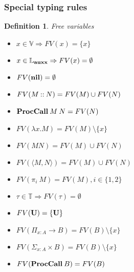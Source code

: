 \documentclass[a4paper]{article}
\newtheorem{defin}{Definition}
\begin{document}
\begin{prooftree}
\end{prooftree}

\begin{prooftree}
\end{prooftree}

\begin{prooftree}
\end{prooftree}

\subsubsection{Special typing rules}

\begin{prooftree}
\end{prooftree}

\begin{defin} Free variables

  \begin{itemize}
    \item $x \in \mathbb{V} \Rightarrow FV(x) = \{ x \}$
    \item $x \in \mathbb{L}_{\bf auxx} \Rightarrow FV(x) = \emptyset$
    \item $FV(\bf nil) = \emptyset$
    \item $FV(M {\: \bf :: \:} N) = FV(M) \cup FV(N)$
    \item ${\bf ProcCall \:} M \: N = FV(N)$
    \item $FV(\lambda x. M) = FV(M) \setminus \{ x \}$
    \item $FV(M N) = FV(M) \cup FV(N)$
    \item $FV(\langle M , N \rangle) = FV(M) \cup FV(N)$
    \item $FV (\pi_i \: M) = FV(M), i \in \{ 1, 2\}$
    \item $\tau \in \mathbb{T} \Rightarrow FV (\tau) = \emptyset$
    \item $FV ({\bf U}) = \{ {\bf U} \}$
    \item $FV(\Pi_{x : A} \to B) = FV(B) \setminus \{ x \}$
    \item $FV(\Sigma_{x : A} \times B) = FV(B) \setminus \{ x \}$
    \item $FV({\bf ProcCall \:} B) = FV(B)$
  \end{itemize}
\end{defin}
\end{document}
